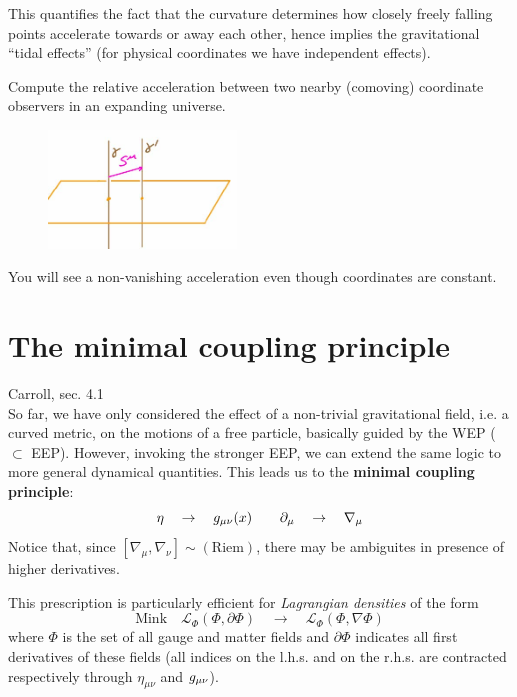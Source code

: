\documentclass[../main/main.tex]{subfiles}
\begin{document}
This quantifies the fact that the curvature determines how closely freely falling points accelerate towards or away each other, hence implies the gravitational ``tidal effects'' (for physical coordinates we have independent effects).

\begin{exercise}
Compute the relative acceleration between two nearby (comoving) coordinate observers in an expanding universe. 
\begin{figure}[H]
\centering
\includegraphics[width=5cm]{../img/ex-geodesic-deviation.jpg}
\end{figure}
\noindent
You will see a non-vanishing acceleration even though coordinates are constant. 
\end{exercise}


\section{The minimal coupling principle}

\textsf{Carroll, sec. 4.1}\\

So far, we have only considered the effect of a non-trivial gravitational field, i.e. a curved metric, on the motions of a free particle, basically guided by the WEP ($\subset$ EEP). However, invoking the stronger EEP, we can extend the same logic to more general dynamical quantities. This leads us to the \textbf{minimal coupling principle}:
\[\eta\quad\to\quad g_{\mu\nu}(x)\qquad\partial_{\mu}\quad\to\quad\nabla_\mu\]
Notice that, since $[\nabla_\mu,\nabla_\nu]\sim(\text{Riem})$, there may be ambiguites in presence of higher derivatives. 

This prescription is particularly efficient for \emph{Lagrangian densities} of the form
\[\text{Mink}\quad\mathcal L_\Phi(\Phi,\partial\Phi)\quad\longrightarrow\quad\mathcal L_\Phi(\Phi,\nabla\Phi)\]
where $\Phi$ is the set of all gauge and matter fields and $\partial\Phi$ indicates all first derivatives of these fields (all indices on the l.h.s. and on the r.h.s. are contracted respectively through $\eta_{\mu\nu}$ and $g_{\mu \nu}$).
\end{document}
